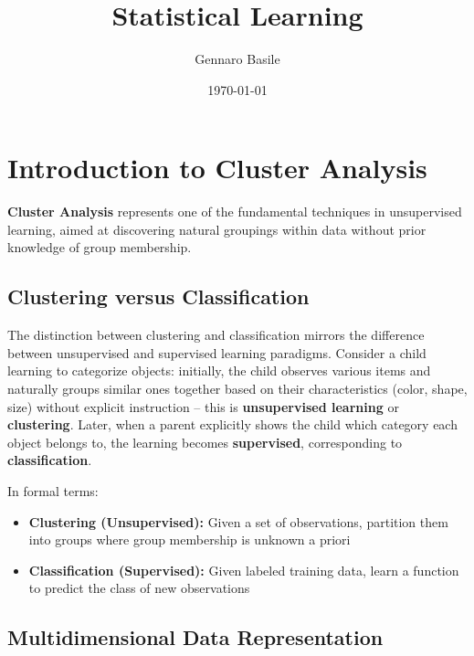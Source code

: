 \documentclass[11pt]{article}
\title{\Huge Statistical Learning}
\author{\Large Gennaro Basile}
\date{\today}
\begin{document}
\maketitle



\captionsetup[figure]{labelfont=bf}



\pagebreak

\tableofcontents

\pagebreak


\section{Introduction to Cluster Analysis}

\textbf{Cluster Analysis} represents one of the fundamental techniques in unsupervised learning, aimed at discovering natural groupings within data without prior knowledge of group membership. 

\subsection{Clustering versus Classification}

The distinction between clustering and classification mirrors the difference between unsupervised and supervised learning paradigms. Consider a child learning to categorize objects: initially, the child observes various items and naturally groups similar ones together based on their characteristics (color, shape, size) without explicit instruction -- this is \textbf{unsupervised learning} or \textbf{clustering}. Later, when a parent explicitly shows the child which category each object belongs to, the learning becomes \textbf{supervised}, corresponding to \textbf{classification}.

In formal terms:
\begin{itemize}
    \item \textbf{Clustering (Unsupervised):} Given a set of observations, partition them into groups where group membership is unknown a priori
    \item \textbf{Classification (Supervised):} Given labeled training data, learn a function to predict the class of new observations
\end{itemize}

\subsection{Multidimensional Data Representation}
\end{document}
